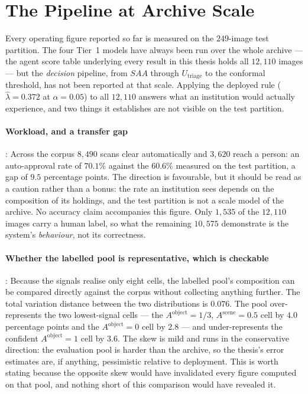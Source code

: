 \documentclass[12pt,a4paper]{report}
\begin{document}
\section{The Pipeline at Archive Scale}
\label{sec:full_corpus}

Every operating figure reported so far is measured on the $249$-image test partition. The
four Tier~1 models have always been run over the whole archive --- the agent score table
underlying every result in this thesis holds all $12{,}110$ images --- but the \emph{decision}
pipeline, from $SAA$ through $U_{\text{triage}}$ to the conformal threshold, has not been
reported at that scale. Applying the deployed rule ($\hat\lambda = 0.372$ at $\alpha=0.05$)
to all $12{,}110$ answers what an institution would actually experience, and two things it
establishes are not visible on the test partition.

\paragraph{Workload, and a transfer gap}: Across the corpus $8{,}490$ scans clear
automatically and $3{,}620$ reach a person: an auto-approval rate of $70.1\%$ against the
$60.6\%$ measured on the test partition, a gap of $9.5$ percentage points. The direction is
favourable, but it should be read as a caution rather than a bonus: the rate an institution
sees depends on the composition of its holdings, and the test partition is not a scale model
of the archive. No accuracy claim accompanies this figure. Only $1{,}535$ of the $12{,}110$
images carry a human label, so what the remaining $10{,}575$ demonstrate is the system's
\emph{behaviour}, not its correctness.

\paragraph{Whether the labelled pool is representative, which is checkable}: Because the
signals realise only eight cells, the labelled pool's composition can be compared directly
against the corpus without collecting anything further. The total variation distance between
the two distributions is $0.076$. The pool over-represents the two lowest-signal cells --- the
$A^{\text{object}}=1/3$, $A^{\text{scene}}=0.5$ cell by $4.0$ percentage points and the
$A^{\text{object}}=0$ cell by $2.8$ --- and under-represents the confident
$A^{\text{object}}=1$ cell by $3.6$. The skew is mild and runs in the conservative direction:
the evaluation pool is harder than the archive, so the thesis's error estimates are, if
anything, pessimistic relative to deployment. This is worth stating because the opposite skew
would have invalidated every figure computed on that pool, and nothing short of this
comparison would have revealed it.
\end{document}

